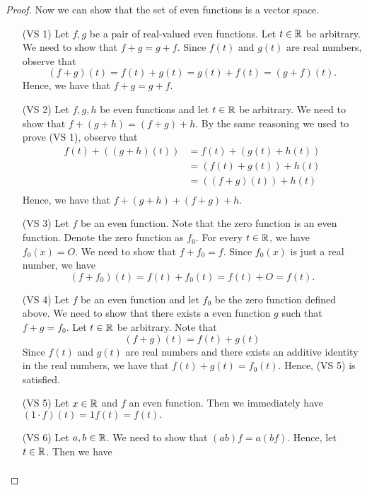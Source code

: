 \begin{proof}
    Now we can show that the set of even functions is a vector space. 
    \begin{enumerate}
        \item[(VS 1)] Let  \( f,g  \) be a pair of real-valued even functions.  Let \( t \in \mathbb{R}  \) be arbitrary. We need to show that \( f + g = g + f  \). Since \( f(t)  \) and \( g(t)  \) are real numbers, observe that 
            \[  (f+g)(t) = f(t) + g(t) = g(t) + f(t) = (g + f)(t).   \] Hence, we have that \(  f + g = g + f  \).
        \item[(VS 2)] Let \( f,g,h  \) be even functions and let \( t \in \mathbb{R}  \) be arbitrary. We need to show that \( f + (g+h) = (f+g) + h \). By the same reasoning we used to prove (VS 1), observe that
            \begin{align*}
               f(t) + ((g+h)(t)) &= f(t) + (g(t) + h(t)) \\
                                 &= (f(t) + g(t)) + h(t) \\
                                 &= ((f+g)(t)) + h(t) \\
            \end{align*}
            Hence, we have that  \( f + ( g+ h ) + (f+g) + h \).
        \item[(VS 3)] Let \( f  \) be an even function. Note that the zero function is an even function. Denote the zero function as \( f_{0}  \). For every \( t \in \mathbb{R}  \), we have \( f_{0}(x) = O \). We need to show that \(  f + f_{0} = f  \). Since \( f_{0}(x)  \) is just a real number, we have 
            \[  (f+ f_{0})(t) = f(t) + f_{0}(t) = f(t) + O = f(t). \]
        \item[(VS 4)] Let \( f  \) be an even function and let \( f_{0}  \) be the zero function defined above. We need to show that there exists a even function \( g  \) such that \( f + g = f_{0} \). Let \( t \in \mathbb{R}  \) be arbitrary. Note that 
            \[ (f+g)(t) = f(t) + g(t)  \]
        Since \( f(t)  \) and \( g(t)  \) are real numbers and there exists an additive identity in the real numbers, we have
        that \(  f(t)  + g(t) = f_{0}(t)  \). Hence, (VS 5) is satisfied.
        \item[(VS 5)] Let \( x \in \mathbb{R}  \) and \( f  \) an even function. Then we immediately have \( (1 \cdot f)(t) = 1 f(t) = f(t).  \) 
        \item[(VS 6)] Let \( a, b \in \mathbb{R}  \). We need to show that \( (ab) f = a (bf)  \). Hence, let \( t \in \mathbb{R}  \). Then we have 
            \begin{align*}

\end{align*}
\end{enumerate}
\end{proof}
